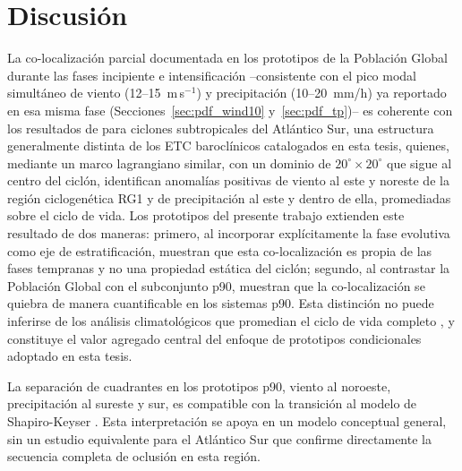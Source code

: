 \section{Discusión}\label{sec:discusion_prototipos}


La co-localización parcial documentada en los prototipos de la Población Global durante las fases incipiente e intensificación --consistente con el pico modal simultáneo de viento (12--15~m\,s$^{-1}$) y precipitación (10--20~mm/h) ya reportado en esa misma fase (Secciones~\ref{sec:pdf_wind10} y~\ref{sec:pdf_tp})-- es coherente con los resultados de \citet{cardoso2022synoptic} para ciclones subtropicales del Atlántico Sur, una estructura generalmente distinta de los ETC baroclínicos catalogados en esta tesis, quienes, mediante un marco lagrangiano similar, con un dominio de $20^{\circ} \times 20^{\circ}$ que sigue al centro del ciclón, identifican anomalías positivas de viento al este y noreste de la región ciclogenética RG1 y de precipitación al este y dentro de ella, promediadas sobre el ciclo de vida. Los prototipos del presente trabajo extienden este resultado de dos maneras: primero, al incorporar explícitamente la fase evolutiva como eje de estratificación, muestran que esta co-localización es propia de las fases tempranas y no una propiedad estática del ciclón; segundo, al contrastar la Población Global con el subconjunto p90, muestran que la co-localización se quiebra de manera cuantificable en los sistemas p90. Esta distinción no puede inferirse de los análisis climatológicos que promedian el ciclo de vida completo \citep{gramcianinov2023impact}, y constituye el valor agregado central del enfoque de prototipos condicionales adoptado en esta tesis.


La separación de cuadrantes en los prototipos p90, viento al noroeste, precipitación al sureste y sur, es compatible con la transición al modelo de Shapiro-Keyser \citep{shapiro1990life}. Esta interpretación se apoya en un modelo conceptual general, sin un estudio equivalente para el Atlántico Sur que confirme directamente la secuencia completa de oclusión en esta región.


